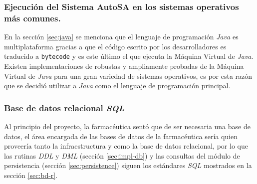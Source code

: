 \subsubsection{Ejecución del Sistema AutoSA en los sistemas operativos más comunes.}
En la sección \ref{sec:java} se menciona que el lenguaje de programación \textit{Java} es multiplataforma gracias a que el código escrito por los desarrolladores es traducido a \texttt{bytecode} y es este último el que ejecuta la Máquina Virtual de \textit{Java}. Existen implementaciones de robustas y ampliamente probadas de la Máquina Virtual de \textit{Java} para una gran variedad de sistemas operativos, es por esta razón que se decidió utilizar a \textit{Java} como el lenguaje de programación principal.

\subsubsection{Base de datos relacional \textit{SQL}}
Al principio del proyecto, la farmacéutica sentó que de ser necesaria una base de datos, el área encargada de las bases de datos de la farmacéutica sería quien proveería tanto la infraestructura y como la base de datos relacional, por lo que las rutinas \textit{DDL} y \textit{DML} (sección \ref{sec:impl-db}) y las consultas del módulo de persistencia (sección \ref{sec:persistence}) siguen los estándares \textit{SQL} mostrados en la sección \ref{sec:bd-r}.

